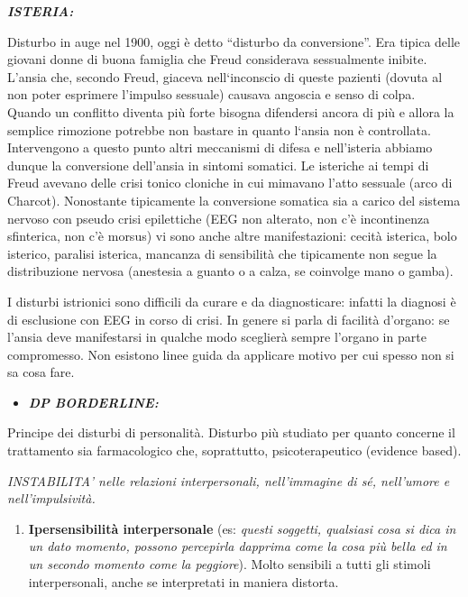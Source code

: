 \documentclass[]{article}
\begin{document}
\textbf{\emph{ISTERIA:}}

Disturbo in auge nel 1900, oggi è detto ``disturbo da conversione''. Era
tipica delle giovani donne di buona famiglia che Freud considerava
sessualmente inibite. L'ansia che, secondo Freud, giaceva nell`inconscio
di queste pazienti (dovuta al non poter esprimere l'impulso sessuale)
causava angoscia e senso di colpa. Quando un conflitto diventa più forte
bisogna difendersi ancora di più e allora la semplice rimozione potrebbe
non bastare in quanto l`ansia non è controllata. Intervengono a questo
punto altri meccanismi di difesa e nell'isteria abbiamo dunque la
conversione dell'ansia in sintomi somatici. Le isteriche ai tempi di
Freud avevano delle crisi tonico cloniche in cui mimavano l'atto
sessuale (arco di Charcot). Nonostante tipicamente la conversione
somatica sia a carico del sistema nervoso con pseudo crisi epilettiche
(EEG non alterato, non c'è incontinenza sfinterica, non c'è morsus) vi
sono anche altre manifestazioni: cecità isterica, bolo isterico,
paralisi isterica, mancanza di sensibilità che tipicamente non segue la
distribuzione nervosa (anestesia a guanto o a calza, se coinvolge mano o
gamba).

I disturbi istrionici sono difficili da curare e da diagnosticare:
infatti la diagnosi è di esclusione con EEG in corso di crisi. In genere
si parla di facilità d'organo: se l'ansia deve manifestarsi in qualche
modo sceglierà sempre l'organo in parte compromesso. Non esistono linee
guida da applicare motivo per cui spesso non si sa cosa fare.

\begin{itemize}
\item
  \textbf{\emph{DP BORDERLINE:}}
\end{itemize}

Principe dei disturbi di personalità. Disturbo più studiato per quanto
concerne il trattamento sia farmacologico che, soprattutto,
psicoterapeutico (evidence based).

\emph{INSTABILITA' nelle relazioni interpersonali, nell'immagine di sé,
nell'umore e nell'impulsività.}

\begin{enumerate}
\def\labelenumi{\arabic{enumi})}
\item
  \textbf{Ipersensibilità interpersonale} (es: \emph{questi soggetti,
  qualsiasi cosa si dica in un dato momento, possono percepirla dapprima
  come la cosa più bella ed in un secondo momento come la peggiore}).
  Molto sensibili a tutti gli stimoli interpersonali, anche se
  interpretati in maniera distorta.
\end{enumerate}
\end{document}

